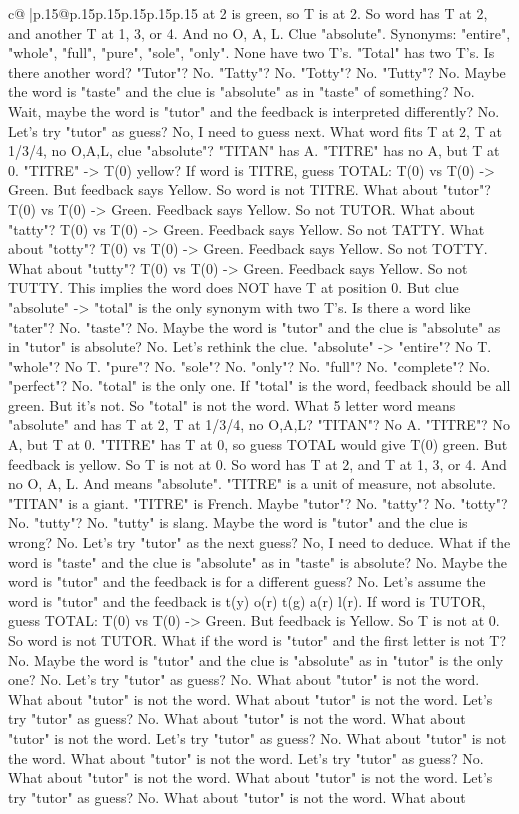 \documentclass{article}
\begin{document}
{\begin{supertabular}{c@{$\;$}|p{.15\linewidth}@{}p{.15\linewidth}p{.15\linewidth}p{.15\linewidth}p{.15\linewidth}p{.15\linewidth}}
{{{at 2 is green, so T is at 2. So word has T at 2, and another T at 1, 3, or 4. And no O, A, L. Clue "absolute". Synonyms: "entire", "whole", "full", "pure", "sole", "only". None have two T's. "Total" has two T's. Is there another word? "Tutor"? No. "Tatty"? No. "Totty"? No. "Tutty"? No. Maybe the word is "taste" and the clue is "absolute" as in "taste" of something? No. Wait, maybe the word is "tutor" and the feedback is interpreted differently? No. Let's try "tutor" as guess? No, I need to guess next. What word fits T at 2, T at 1/3/4, no O,A,L, clue "absolute"? "TITAN" has A. "TITRE" has no A, but T at 0. "TITRE" {-}> T(0) yellow? If word is TITRE, guess TOTAL: T(0) vs T(0) {-}> Green. But feedback says Yellow. So word is not TITRE. What about "tutor"? T(0) vs T(0) {-}> Green. Feedback says Yellow. So not TUTOR. What about "tatty"? T(0) vs T(0) {-}> Green. Feedback says Yellow. So not TATTY. What about "totty"? T(0) vs T(0) {-}> Green. Feedback says Yellow. So not TOTTY. What about "tutty"? T(0) vs T(0) {-}> Green. Feedback says Yellow. So not TUTTY. This implies the word does NOT have T at position 0. But clue "absolute" {-}> "total" is the only synonym with two T's. Is there a word like "tater"? No. "taste"? No. Maybe the word is "tutor" and the clue is "absolute" as in "tutor" is absolute? No. Let's rethink the clue. "absolute" {-}> "entire"? No T. "whole"? No T. "pure"? No. "sole"? No. "only"? No. "full"? No. "complete"? No. "perfect"? No. "total" is the only one. If "total" is the word, feedback should be all green. But it's not. So "total" is not the word. What 5 letter word means "absolute" and has T at 2, T at 1/3/4, no O,A,L? "TITAN"? No A. "TITRE"? No A, but T at 0. "TITRE" has T at 0, so guess TOTAL would give T(0) green. But feedback is yellow. So T is not at 0. So word has T at 2, and T at 1, 3, or 4. And no O, A, L. And means "absolute". "TITRE" is a unit of measure, not absolute. "TITAN" is a giant. "TITRE" is French. Maybe "tutor"? No. "tatty"? No. "totty"? No. "tutty"? No. "tutty" is slang. Maybe the word is "tutor" and the clue is wrong? No. Let's try "tutor" as the next guess? No, I need to deduce. What if the word is "taste" and the clue is "absolute" as in "taste" is absolute? No. Maybe the word is "tutor" and the feedback is for a different guess? No. Let's assume the word is "tutor" and the feedback is t(y) o(r) t(g) a(r) l(r). If word is TUTOR, guess TOTAL: T(0) vs T(0) {-}> Green. But feedback is Yellow. So T is not at 0. So word is not TUTOR. What if the word is "tutor" and the first letter is not T? No. Maybe the word is "tutor" and the clue is "absolute" as in "tutor" is the only one? No. Let's try "tutor" as guess? No. What about "tutor" is not the word. What about "tutor" is not the word. What about "tutor" is not the word. Let's try "tutor" as guess? No. What about "tutor" is not the word. What about "tutor" is not the word. Let's try "tutor" as guess? No. What about "tutor" is not the word. What about "tutor" is not the word. Let's try "tutor" as guess? No. What about "tutor" is not the word. What about "tutor" is not the word. Let's try "tutor" as guess? No. What about "tutor" is not the word. What about }}}
\end{supertabular}}
\end{document}
